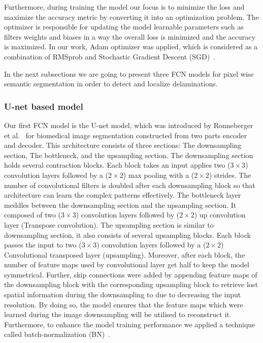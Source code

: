 \documentclass[preprint,9pt]{elsarticle}
\begin{document}
Furthermore, during training the model our focus is to minimize the loss and maximize the accuracy metric by converting it into an optimization problem. 
The optimizer is responsible for updating the model learnable parameters such as filters weights and biases in a way the overall loss is minimized and the accuracy is maximized.
In our work, Adam optimizer was applied, which is considered as a combination of RMSprob and Stochastic Gradient Descent (SGD)~\cite{Kingma2015}. 

In the next subsections we are going to present three FCN models for pixel wise semantic segmentation in order to detect and localize delaminations.
\subsubsection{U-net based model}
Our first FCN model is the U-net model, which was introduced by Ronneberger et al.~\cite{Ronneberger2015} for biomedical image segmentation constructed from two parts encoder and decoder. 
This architecture consists of three sections: The downsampling section, The bottleneck, and the upsampling section. 
The downsampling section holds several contraction blocks. 
Each block takes an input applies two (\(3\times3\)) convolution layers followed by a (\(2\times2\)) max pooling with a (\(2\times2\)) strides. 
The number of convolutional filters is doubled after each downsampling block so that architecture can learn the complex patterns effectively. 
The bottleneck layer meddles between the downsampling section and the upsampling section. 
It composed of two (\(3\times3\)) convolution layers followed by (\(2\times2\)) up convolution layer (Transpose convolution).
The upsampling section is similar to downsampling section, it also consists of several upsampling blocks. 
Each block passes the input to two (\(3\times3\)) convolution layers followed by a (\(2\times2\)) Convolutional transposed layer (upsampling). 
Moreover, after each block, the number of feature maps used by convolutional layer get half to keep the model symmetrical. 
Further, skip connections were added by appending feature maps of the downsampling block with the corresponding upsampling block to retrieve lost spatial information during the downsampling to due to decreasing the input resolution.
By doing so, the model ensures that the feature maps which were learned during the image downsampling will be utilised to reconstruct it. 
Furthermore, to enhance the model training performance we applied a technique called batch-normalization (BN)~\cite{Ioffe2015}.
\end{document}
